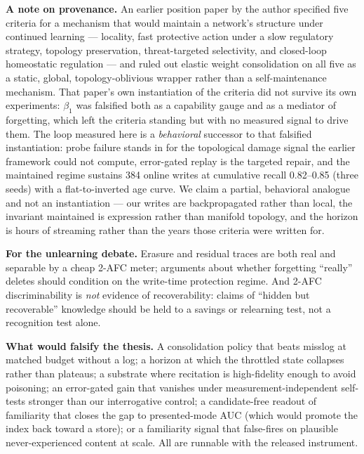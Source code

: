 \documentclass[11pt]{article}
\begin{document}
\textbf{A note on provenance.} An earlier position paper by the author \citep{lin2026mathlife}
specified five criteria for a mechanism that
would maintain a network's structure under continued learning --- locality, fast protective
action under a
slow regulatory strategy, topology preservation, threat-targeted selectivity, and closed-loop
homeostatic
regulation --- and ruled out elastic weight consolidation on all five as a static, global,
topology-oblivious
wrapper rather than a self-maintenance mechanism. That paper's own instantiation of the
criteria did not
survive its own experiments: $\beta_1$ was falsified both as a capability gauge and as a
mediator of
forgetting, which left the criteria standing but with no measured signal to drive them. The
loop measured here
is a \emph{behavioral} successor to that falsified instantiation: probe failure stands in for
the topological
damage signal the earlier framework could not compute, error-gated replay is the targeted
repair, and the
maintained regime sustains 384 online writes at cumulative recall 0.82--0.85 (three seeds) with a
flat-to-inverted
age curve. We claim a partial, behavioral analogue and not an instantiation --- our writes are
backpropagated
rather than local, the invariant maintained is expression rather than manifold topology, and
the horizon is
hours of streaming rather than the years those criteria were written for.

\textbf{For the unlearning debate.} Erasure and residual traces are both real and separable by a
cheap 2-AFC meter; arguments about whether forgetting ``really'' deletes should condition on the
write-time protection regime. And 2-AFC discriminability is \emph{not} evidence of
recoverability: claims of ``hidden but recoverable'' knowledge should be held to a savings or
relearning test, not a recognition test alone.

\textbf{What would falsify the thesis.} A consolidation policy that beats misslog at matched
budget without a log; a horizon at which the throttled state collapses rather than plateaus; a
substrate where recitation is high-fidelity enough to avoid poisoning; an error-gated gain that
vanishes under measurement-independent self-tests stronger than our interrogative control; a
candidate-free readout of familiarity that closes the gap to presented-mode AUC (which would
promote the index back toward a store); or a familiarity signal that false-fires on plausible
never-experienced content at scale. All are runnable with the released instrument.
\end{document}
